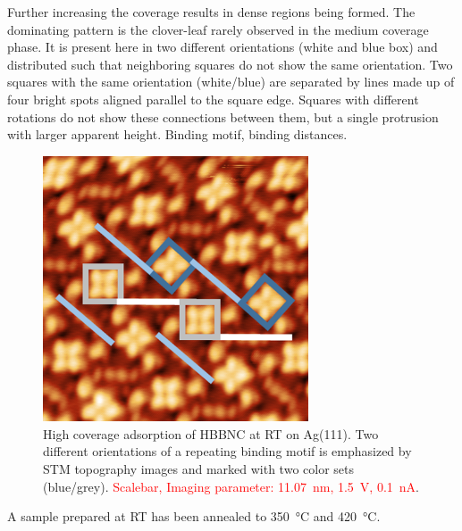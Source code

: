 Further increasing the coverage results in dense regions being formed. The dominating pattern is the clover-leaf rarely observed in the medium coverage phase. It is present here in two different orientations (white and blue box) and distributed such that neighboring squares do not show the same orientation. Two squares with the same orientation (white/blue) are separated by lines made up of four bright spots aligned parallel to the square edge. Squares with different rotations do not show these connections between them, but a single protrusion with larger apparent height.
Binding motif, binding distances.


\begin{figure}[] \centering
	\includegraphics[width=0.7\textwidth]{./images/hbbnc-ag-111-rt-high-coverage}
	\caption{High coverage adsorption of HBBNC at RT on Ag(111). Two different orientations of a repeating binding motif is emphasized by STM topography images and marked with two color sets (blue/grey). \textcolor{red}{Scalebar, Imaging parameter: \SI{11.07}{\nano \meter}, \SI{1.5}{\volt}, \SI{0.1}{\nano \ampere}}.}
	\label{}
\end{figure}

A sample prepared at RT has been annealed to \SI{350}{\celsius} and \SI{420}{\celsius}.

